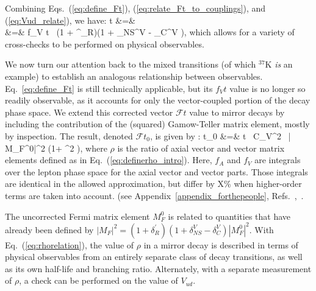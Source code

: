 Combining Eqs.~(\ref{eq:define_Ft}), (\ref{eq:relate_Ft_to_couplings}), and (\ref{eq:Vud_relate}), we have:
\bea
{}t &=&  
\nonumber \\
&=& 
f_V t \, (1 + \delta^\prime_R)(1 + \delta_{NS}^V - \delta_C^{V} ), 
\label{eq:Ft_with_Vud}
\eea
which allows for a variety of cross-checks to be performed on physical observables.  

We now turn our attention back to the mixed transitions (of which $^{37}$K \emph{is} an example) to establish an analogous relationship between observables.  Eq.~\ref{eq:define_Ft} is still technically applicable, but its $f_Vt$ value is no longer so readily observable, as it accounts for only the vector-coupled portion of the decay phase space.  We extend this corrected vector $\mathcal{F}t$ value to mirror decays by including the contribution of the (squared) Gamow-Teller matrix element, mostly by inspection.  The result, denoted $\mathcal{F}t_0$, is given by
\cite{shidling2014}
\cite{naviliat2009april}
\cite{ben_Abeta}:
\bea
{}t_0 &=&  t \, C_V^2 \, | M_F^0|^2 \left(1+ \rho^2 \right),
\label{eq:rhorelation}
\eea
where $\rho$ is the ratio of axial vector and vector matrix elements defined as in Eq.~(\ref{eq:definerho_intro}).  
Here, $f_A$ and $f_V$ are integrals over the lepton phase space for the axial vector and vector parts. Those integrals are identical in the allowed approximation, but differ by X\% when higher-order terms are taken into account.
(see Appendix~\ref{appendix_forthepeople}, Refs.~\cite{holstein},~\cite{Hayen2021}.


The uncorrected Fermi matrix element $M_F^0$ is related to quantities that have already been defined by $| M_F |^2 =  (1 + \delta^\prime_R)(1 + \delta_{NS}^V - \delta_C^{V} ) | M_F^0 |^2 $.  With Eq.~(\ref{eq:rhorelation}), the value of $\rho$ in a mirror decay is described in terms of physical observables from an entirely separate class of decay transitions, as well as its own half-life and branching ratio.  Alternately, with a separate measurement of $\rho$, a check can be performed on the value of $V_{ud}$.


